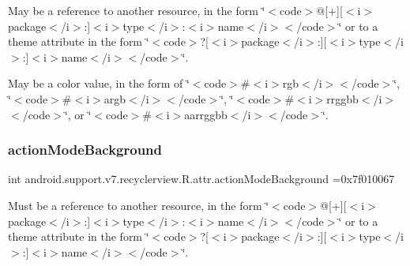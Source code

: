 May be a reference to another resource, in the form \char`\"{}$<$code$>$@\mbox{[}+\mbox{]}\mbox{[}$<$i$>$package$<$/i$>$\+:\mbox{]}$<$i$>$type$<$/i$>$\+:$<$i$>$name$<$/i$>$$<$/code$>$\char`\"{} or to a theme attribute in the form \char`\"{}$<$code$>$?\mbox{[}$<$i$>$package$<$/i$>$\+:\mbox{]}\mbox{[}$<$i$>$type$<$/i$>$\+:\mbox{]}$<$i$>$name$<$/i$>$$<$/code$>$\char`\"{}. 

May be a color value, in the form of \char`\"{}$<$code$>$\#$<$i$>$rgb$<$/i$>$$<$/code$>$\char`\"{}, \char`\"{}$<$code$>$\#$<$i$>$argb$<$/i$>$$<$/code$>$\char`\"{}, \char`\"{}$<$code$>$\#$<$i$>$rrggbb$<$/i$>$$<$/code$>$\char`\"{}, or \char`\"{}$<$code$>$\#$<$i$>$aarrggbb$<$/i$>$$<$/code$>$\char`\"{}. \mbox{\label{classandroid_1_1support_1_1v7_1_1recyclerview_1_1R_1_1attr_a890112a454a80e8bd0cafdaab93d8053}} 
\subsubsection{\texorpdfstring{action\+Mode\+Background}{actionModeBackground}}
{\footnotesize\ttfamily int android.\+support.\+v7.\+recyclerview.\+R.\+attr.\+action\+Mode\+Background =0x7f010067\hspace{0.3cm}{\ttfamily [static]}}

Must be a reference to another resource, in the form \char`\"{}$<$code$>$@\mbox{[}+\mbox{]}\mbox{[}$<$i$>$package$<$/i$>$\+:\mbox{]}$<$i$>$type$<$/i$>$\+:$<$i$>$name$<$/i$>$$<$/code$>$\char`\"{} or to a theme attribute in the form \char`\"{}$<$code$>$?\mbox{[}$<$i$>$package$<$/i$>$\+:\mbox{]}\mbox{[}$<$i$>$type$<$/i$>$\+:\mbox{]}$<$i$>$name$<$/i$>$$<$/code$>$\char`\"{}. \mbox{\label{classandroid_1_1support_1_1v7_1_1recyclerview_1_1R_1_1attr_a3d7655c4d730709b09ebfe2c307eed9a}} 
